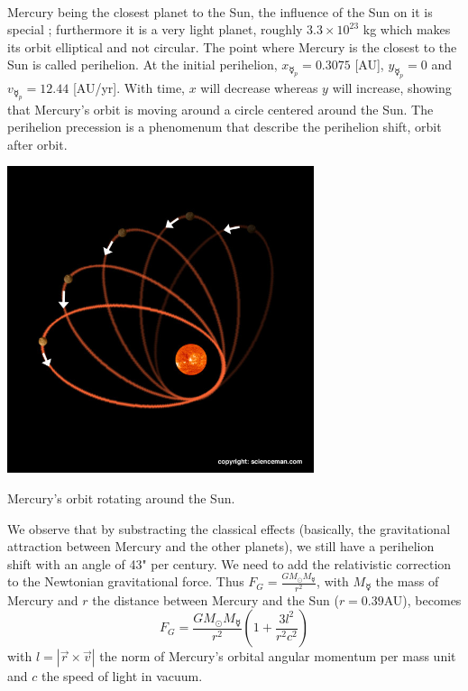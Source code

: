 \documentclass[a4paper, twoside, 11pt]{report}
\theoremstyle{theorem}
\theoremstyle{remark}
\theoremstyle{exemple}
\begin{document}
                \paragraph{}Mercury being the closest planet to the Sun, the influence of the Sun on it is special ; furthermore it is a very light planet, roughly $3.3\times{10}^{23}$ kg which makes its orbit elliptical and not circular. The point where Mercury is the closest to the Sun is called perihelion. At the initial perihelion, $x_{\mercury_p} = 0.3075$ [AU], $y_{\mercury_p} = 0$ and $v_{\mercury_p}=12.44$ [AU/yr]. With time, $x$ will decrease whereas $y$ will increase, showing that Mercury's orbit is moving around a circle centered around the Sun. The perihelion precession is a phenomenum that describe the perihelion shift, orbit after orbit. 
              
                
         \begin{center}
            \includegraphics[width=9cm, height=9cm]{mercury_precession}
        \end{center}
        \begin{center}
            Mercury's orbit rotating around the Sun.
        \end{center}
                
                We observe that by substracting the classical effects (basically, the gravitational attraction between Mercury and the other planets), we still have a perihelion shift with an angle of 43" per century. We need to add the relativistic correction to the Newtonian gravitational force. Thus $\displaystyle F_G = \frac{GM_{\odot}M_{\mercury}}{r^2}$, with $M_{\mercury}$ the mass of Mercury and $r$ the distance between Mercury and the Sun ($r=0.39$AU), becomes
                    \begin{equation*}
                        F_G = \frac{GM_{\odot}M_{\mercury}}{r^2}\left(1 + \frac{3l^2}{r^2c^2}\right)
                        \tag{13}
                    \end{equation*}
                with $l=|\vec{r}\times\vec{v}|$ the norm of Mercury's orbital angular momentum per mass unit and $c$ the speed of light in vacuum.\\
               
\end{document}
